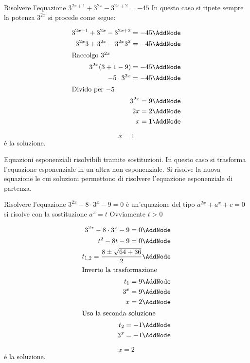 \begin{esempio}
	Risolvere l'equazione $3^{2x+1}+3^{2x}-3^{2x+2}=-45$
	In questo caso si ripete sempre la potenza $3^{2x}$  si procede come segue:
	\begin{NodesList}[margin=4cm]
		\begin{align*}
			3^{2x+1}+3^{2x}-3^{2x+2}=-45\AddNode\\
			3^{2x}3+3^{2x}-3^{2x}3^2=-45\AddNode\\
			\intertext{\hfil Raccolgo $3^{2x}$}
			3^{2x}(3+1-9)=-45\AddNode\\
			-5\cdot 3^{2x}=-45\AddNode\\
			\intertext{\hfil Divido per $-5$}
			3^{2x}=9\AddNode\\
			2x=2\AddNode\\
			x=1\AddNode
		\end{align*}
	\end{NodesList}
	\[x=1\]
	\'{e} la soluzione.
\end{esempio}
Equazioni esponenziali risolvibili tramite sostituzioni. In questo caso si trasforma l'equazione esponenziale in un altra non esponenziale. Si risolve la nuova equazione le cui soluzioni permettono di risolvere l'equazione esponenziale di partenza.
\begin{esempio}
	Risolvere l'equazione $3^{2x}-8\cdot 3^x-9=0$
	 è un'equazione del tipo $a^{2x}+a^{x}+c=0$ si risolve con la sostituzione $a^{x}=t$ Ovviamente $t>0$ 
	\begin{NodesList} [margin=4cm]
		\begin{align*}
			3^{2x}-8\cdot 3^x-9=0\AddNode\\
			t^2-8t-9=0\AddNode\\
			t_{1,2}=\dfrac{8\pm\sqrt{64+36}}{2}\AddNode\\
			\intertext{\hfil Inverto la trasformazione}
			t_{1}=9\AddNode\\
			3^{x}=9\AddNode\\
			x=2\AddNode\\
			\intertext{\hfil Uso la seconda soluzione}
			t_{2}=-1\AddNode\\
			3^x=-1\AddNode
		\end{align*}
		\LinkNodes{}%
	\end{NodesList}
	\[x=2\]
	\'{e} la soluzione.
\end{esempio}
